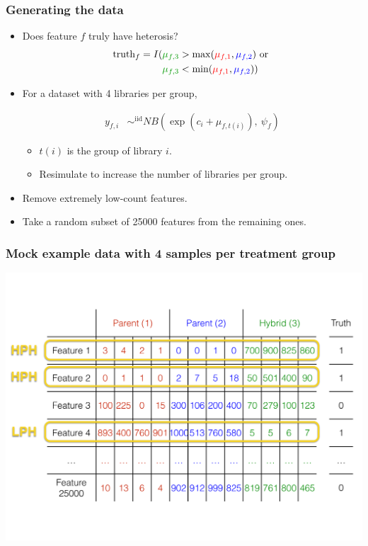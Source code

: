 \documentclass[handout]{beamer}
\numberwithin{equation}{section}
\begin{document}
\begin{frame}
\frametitle{Generating the data}

\begin{itemize}
\item Does feature $f$ truly have heterosis?
\begin{align*}
\text{truth}_f = I(&{\color{darkgreen}\mu_{f, 3}} > \max({\color{red}\mu_{f, 1}}, {\color{blue}\mu_{f, 2}}) \text{ or } \\ &{\color{darkgreen}\mu_{f, 3}} < \min({\color{red}\mu_{f, 1}}, {\color{blue}\mu_{f, 2}}))
\end{align*}

\pause 

\item For a dataset with 4 libraries per group,


\begin{align*}
y_{f, i} &\mathop{\sim}^{\text{iid}} NB\left (\exp \left ( c_{i} + \mu_{f, t(i)} \right ), \ \psi_f  \right )
\end{align*}

\begin{itemize}
\item $t(i)$ is the group of library $i$.
\pause \item Resimulate to increase the number of libraries per group.
\end{itemize}



\pause \item Remove extremely low-count features.
\pause \item Take a random subset of 25000 features from the remaining ones.
\end{itemize}
\end{frame}

\begin{frame}
\frametitle{Mock example data with 4 samples per treatment group}
\begin{center}
\includegraphics[scale=.28]{data}
\end{center}
\end{frame}
\end{document}
